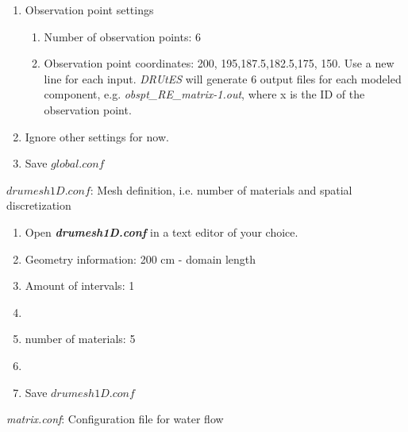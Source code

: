 \documentclass[
10pt, %
a4paper, %
oneside, %
headinclude,footinclude, %
BCOR5mm, %
]{scrartcl}
\begin{document}
\begin{enumerate}
\item Observation point settings \begin{enumerate}
\item Number of observation points: 6 
\item Observation point coordinates: 200, 195,187.5,182.5,175, 150. Use a new line for each input. \textit{DRUtES} will generate 6 output files for each modeled component, e.g. \textit{obspt\_RE\_matrix-1.out}, where x is the ID of the observation point. 
\end{enumerate}
\item Ignore other settings for now. 
\item Save $global.conf$
\end{enumerate}


$drumesh1D.conf$: Mesh definition, i.e. number of materials and spatial discretization
\begin{enumerate}
\item Open \textbf{\emph{drumesh1D.conf}} in a text editor of your choice. 
\item Geometry information: 200 cm - domain length
\item Amount of intervals: 1
\item
{}
\item number of materials: 5
\item {}
\item Save $drumesh1D.conf$
\end{enumerate}

\emph{matrix.conf}: Configuration file for water flow 
\end{document}
